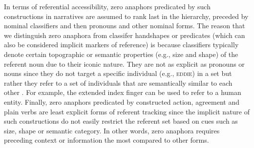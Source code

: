 \documentclass[review]{elsarticle} %
\begin{document}
In terms of referential accessibility, zero anaphors predicated by such
constructions in narratives are assumed to rank last in the hierarchy,
preceded by nominal classifiers and then pronouns and other nominal
forms. The reason that we distinguish zero anaphora from classifer
handshapes or predicates (which can also be considered implicit markers
of reference) is because classifiers typically denote certain
topographic or semantic properties (e.g., size and shape) of the
referent noun due to their iconic nature. They are not as explicit as
pronouns or nouns since they do not target a specific individual (e.g.,
\textsc{eddie}) in a set but rather they refer to a set of individuals
that are semantically similar to each other \citep{morgan2005}. For
example, the extended index finger can be used to refer to a human
entity. Finally, zero anaphors predicated by constructed action,
agreement and plain verbs are least explicit forms of referent tracking
since the implicit nature of such constructions do not easily restrict
the referent set based on cues such as size, shape or semantic category.
In other words, zero anaphora requires preceding context or information
the most compared to other forms.
\end{document}
